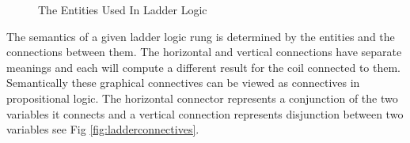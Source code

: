\medskip

\begin{figure}[h!]
 \begin{center}
\end{center}
\label{fig:pelicanladder}
\caption{The Entities Used In Ladder Logic}

\end{figure}

\medskip

The semantics of a given ladder logic rung is determined by the entities and the connections between them.  The horizontal and vertical connections have separate meanings and each will compute a different result for the coil connected to them.
Semantically these graphical connectives can be viewed as connectives in propositional logic. The horizontal connector represents a conjunction of the two variables it connects and a vertical connection represents disjunction between two variables see Fig \ref{fig:ladderconnectives}.


\begin{comment}
A Ladder logic rung is built using these entities and connections between
them. The shapes of the connections between the contacts determines how the
value of the coil is computed from them. Using propositional logic for comparison,  
a horizontal connection between two contacts represents logical conjunction
and a vertical connection between two contacts represents logical
disjunction see Figure \ref{fig:ladderconnectives}. 
\end{comment}

\medskip

